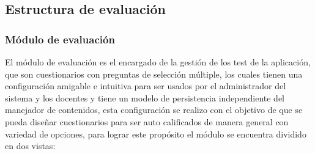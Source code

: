 \documentclass[letterpaper, 11pt, oneside]{article}
\theoremstyle{definition}
\theoremstyle{remark}
\begin{document}
\clearpage
\subsection{Estructura de evaluación}
\subsubsection{Módulo de evaluación}

El módulo de evaluación es el encargado de la gestión de los test de la aplicación, que son cuestionarios con preguntas de selección múltiple, los cuales tienen una configuración amigable e intuitiva para ser usados por el administrador del sistema y los docentes y tiene un modelo de persistencia independiente del manejador de contenidos, esta configuración se realizo con el objetivo de que se pueda diseñar cuestionarios para ser auto calificados de manera general con variedad de opciones, para lograr este propósito el módulo se encuentra dividido en dos vistas:
\end{document}
